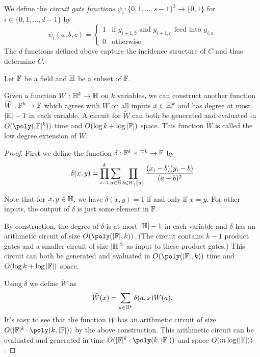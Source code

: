 \begin{definition}\label{def:psis}
  We define the \emph{circuit gate functions} $\psi_i:\{0,1,\ldots, s-1\}^3 \to
  \{0,1\}$ for $i \in \{0, 1, \ldots, d-1\}$ by
	\[
    \psi_i(a,b,c) = \begin{cases}
      1 &\text{if $g_{i+1,b}$ and $g_{i+1,c}$ feed into $g_{i,a}$}\\
      0 &\text{otherwise}
    \end{cases}
	\]
  The $d$ functions defined above capture the incidence structure of $C$ and
  thus determine $C$.
\end{definition}

Let $\mathbb{F}$ be a field and $\mathbb{H}$ be a subset of $\mathbb{F}$.


\begin{lemma}\label{lem:lde}
  Given a function $W:\mathbb{H}^k \to \mathbb{H}$ on $k$ variables, we can construct another
  function $\widetilde{W}:\mathbb{F}^k \to \mathbb{F}$ which agrees with $W$ on all inputs $x
  \in \mathbb{H}^k$ and has degree at most $|\mathbb{H}|-1$ in each variable. A circuit for
  $\tilde{W}$ can both be generated and evaluated in $O(\poly(|\F|^k))$ time
  and $O(\log k + \log |\mathbb{F}|)$ space. This function $\tilde{W}$ is called the
  low degree extension of $W$.
\end{lemma}

\begin{proof}
  First we define the function $\delta : \mathbb{F}^k \times \mathbb{F}^k \to \mathbb{F}$ by
  \begin{equation}
    \delta(x,y) = \prod_{i=1}^k \sum_{a \in \mathbb{H}} \prod_{b \in \mathbb{H}\setminus\{a\}} \frac{(x_i-b)(y_i-b)}{(a-b)^2}
  \end{equation}

  Note that for $x, y \in \mathbb{H}$, we have $\delta(x, y) = 1$ if and only if $x =
  y$. For other inputs, the output of $\delta$ is just some element in $\mathbb{F}$.

  By construction, the degree of $\delta$ is at most $|\mathbb{H}|-1$ in each variable
  and $\delta$ has an arithmetic circuit of size $O(\poly(|\F|, k))$. (The
  circuit contains $k-1$ product gates and a smaller circuit of size $|\mathbb{H}|^2$
  as input to these product gates.) This circuit can both be generated and
  evaluated in $O(\poly(|\F|, k))$ time and $O(\log k + \log |\mathbb{F}|)$ space.

  Using $\delta$ we define $\widetilde{W}$ as
	\begin{equation*}
    \widetilde{W}(x) = \sum_{a \in \mathbb{H}^k} \delta(a,x) W(a).
	\end{equation*}
  It's easy to see that the function $\widetilde{W}$ has an arithmetic circuit
  of size $O(|\F|^k \cdot \poly(k , |\F|))$ by the above construction. This
  arithmetic circuit can be evaluated and generated in time $O(|\F|^k \cdot
  \poly(k , |\F|))$ and space $O(m \log (|\mathbb{F}|))$.
\end{proof}

